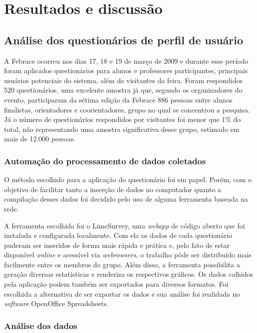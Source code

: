 
\chapter{Resultados e discussão}

\section{Análise dos questionários de perfil de usuário}

A Febrace ocorreu nos dias 17, 18 e 19 de março de 2009 e durante esse período foram aplicados questionários para alunos e professores participantes, principais usuários potenciais do sistema, além de visitantes da feira. Foram respondidos 520 questionários, uma excelente amostra já que, segundo os organizadores do evento, participaram da sétima edição da Febrace 886 pessoas entre alunos finalistas, orientadores e coorientadores, grupo no qual se concentrou a pesquisa. Já o número de questionários respondidos por visitantes foi menor que 1\% do total, não representando uma amostra significativa desse grupo, estimado em mais de 12.000 pessoas.

  \subsection{Automação do processamento de dados coletados}
    O método escolhido para a aplicação do questionário foi em papel. Porém, com o objetivo de facilitar tanto a inserção de dados no computador quanto a compilação desses dados foi decidido pelo uso de alguma ferramenta baseada na rede.

    A ferramenta escolhida foi o LimeSurvey, uma \textit{webapp} de código aberto que foi instalada e configurada localmente. Com ela os dados de cada questionário puderam ser inseridos de forma mais rápida e prática e, pelo fato de estar disponível \textit{online} e acessível via \textit{webrowsers}, o trabalho pôde ser distribuído mais facilmente entre os membros do grupo. Além disso, a ferramenta possibilita a geração diversas estatísticas e renderiza os respectivos gráficos. Os dados colhidos pela aplicação podem também ser exportados para diversos formatos. Foi escolhida a alternativa de ser exportar os dados e sua análise foi realidada no \textit{software} OpenOffice Spreadsheets.

  \subsection{Análise dos dados}

